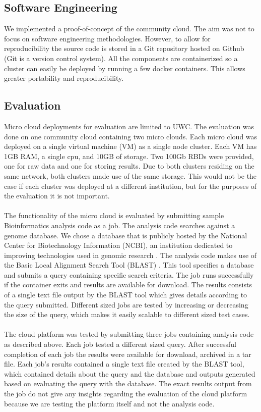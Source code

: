 \documentclass{sig-alternate-05-2015}
\begin{document}
\subsection{Software Engineering}

We implemented a proof-of-concept of the community cloud. The aim was not to focus on software engineering methodologies. However, to allow for reproducibility the source code is stored in a Git repository hosted on Github (Git is a version control system). All the components are containerized so a cluster can easily be deployed by running a few docker containers. This allows greater portability and reproducibility. 




\subsection{Evaluation}
Micro cloud deployments for evaluation are limited to UWC. The evaluation was done on one community cloud containing two micro clouds. Each micro cloud was deployed on a single virtual machine (VM) as a single node cluster. Each VM has 1GB RAM, a single cpu, and 10GB of storage. Two 100Gb RBDs were provided, one for raw data and one for storing results. Due to both clusters residing on the same network, both clusters made use of the same storage. This would not be the case if each cluster was deployed at a different institution, but for the purposes of the evaluation it is not important.
\\\\
The functionality of the micro cloud is evaluated by submitting sample Bioinformatics analysis code as a job. The analysis code searches against a genome database. We chose a database that is publicly hosted by the National Center for Biotechnology Information (NCBI), an institution dedicated to improving technologies used in genomic research \cite{pruitt2005ncbi}. The analysis code makes use of the Basic Local Alignment Search Tool (BLAST) \cite{camacho2009blast}. This tool specifies a database and submits a query containing specific search criteria. The job runs successfully if the container exits and results are available for download. The results consists of a single text file output by the BLAST tool which gives details according to the query submitted. Different sized jobs are tested by increasing or decreasing the size of the query, which makes it easily scalable to different sized test cases.
\\\\
The cloud platform was tested by submitting three jobs containing analysis code as described above. Each job tested a different sized query. After successful completion of each job the results were available for download, archived in a tar file. Each job's results contained a single text file created by the BLAST tool, which contained details about the query and the database and outputs generated based on evaluating the query with the database. The exact results output from the job do not give any insights regarding the evaluation of the cloud platform because we are testing the platform itself and not the analysis code. 
\end{document}
